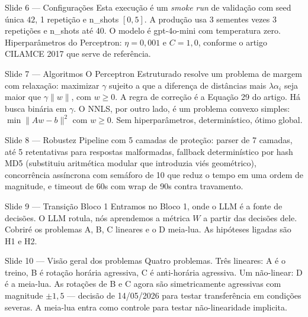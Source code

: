 \documentclass[aspectratio=169,10pt]{beamer}
\begin{document}
\begin{frame}{Slide 6 --- Configura\c{c}\~oes}
\footnotesize
Esta execu\c{c}\~ao \'e um \emph{smoke run} de valida\c{c}\~ao com seed \'unica $42$, 1 repeti\c{c}\~ao e n\_shots $[0, 5]$. A produ\c{c}\~ao usa 3 sementes vezes 3 repeti\c{c}\~oes e n\_shots at\'e 40. O modelo \'e gpt-4o-mini com temperatura zero. Hiperpar\^ametros do Perceptron: $\eta=0{,}001$ e $C=1{,}0$, conforme o artigo CILAMCE 2017 que serve de refer\^encia.
\end{frame}

\begin{frame}{Slide 7 --- Algoritmos}
\footnotesize
O Perceptron Estruturado resolve um problema de margem com relaxa\c{c}\~ao: maximizar $\gamma$ sujeito a que a diferen\c{c}a de dist\^ancias mais $\lambda \alpha_i$ seja maior que $\gamma \|w\|$, com $w \geq 0$. A regra de corre\c{c}\~ao \'e a Equa\c{c}\~ao 29 do artigo. H\'a busca bin\'aria em $\gamma$. O NNLS, por outro lado, \'e um problema convexo simples: $\min \|Aw-b\|^2$ com $w \geq 0$. Sem hiperpar\^ametros, determin\'istico, \'otimo global.
\end{frame}

\begin{frame}{Slide 8 --- Robustez}
\footnotesize
Pipeline com 5 camadas de prote\c{c}\~ao: parser de 7 camadas, at\'e 5 retentativas para respostas malformadas, fallback determin\'istico por hash MD5 (substituiu aritm\'etica modular que introduzia vi\'es geom\'etrico), concorr\^encia ass\'incrona com sem\'aforo de 10 que reduz o tempo em uma ordem de magnitude, e timeout de 60s com wrap de 90s contra travamento.
\end{frame}

\begin{frame}{Slide 9 --- Transi\c{c}\~ao Bloco 1}
\footnotesize
Entramos no Bloco 1, onde o LLM \'e a fonte de decis\~oes. O LLM rotula, n\'os aprendemos a m\'etrica $W$ a partir das decis\~oes dele. Cobrir\'e os problemas A, B, C lineares e o D meia-lua. As hip\'oteses ligadas s\~ao H1 e H2.
\end{frame}

\begin{frame}{Slide 10 --- Vis\~ao geral dos problemas}
\footnotesize
Quatro problemas. Tr\^es lineares: A \'e o treino, B \'e rota\c{c}\~ao hor\'aria agressiva, C \'e anti-hor\'aria agressiva. Um n\~ao-linear: D \'e a meia-lua. As rota\c{c}\~oes de B e C agora s\~ao simetricamente agressivas com magnitude $\pm 1{,}5$ --- decis\~ao de 14/05/2026 para testar transfer\^encia em condi\c{c}\~oes severas. A meia-lua entra como controle para testar n\~ao-linearidade implicita.
\end{frame}
\end{document}

